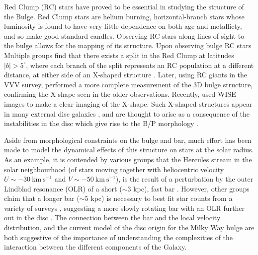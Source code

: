 Red Clump (RC) stars have proved to be essential in studying the structure of the Bulge. Red Clump stars are helium burning, horizontal-branch stars whose luminosity is found to have very little dependence on both age and metallicty, and so make good standard candles. Observing RC stars along lines of sight to the bulge allows for the mapping of its structure. Upon observing bulge RC stars Multiple groups find that there exists a split in the Red Clump at latitudes $|b| > 5^{\circ}$, where each branch of the split represents an RC population at a different distance, at either side of an X-shaped structure \citep{2010ApJ...721L..28N,2010ApJ...724.1491M,2011AJ....142...76S}. Later, using RC giants in the VVV survey, \citet{2013MNRAS.435.1874W} performed a more complete measurement of the 3D bulge structure, confirming the X-shape seen in the older observations. Recently, \citet{2016AJ....152...14N} used WISE images to make a clear imaging of the X-shape. Such X-shaped structures appear in many external disc galaxies \citep[e.g.][]{2006MNRAS.370..753B}, and are thought to arise as a consequence of the instabilities in the disc which give rise to the B/P morphology \citep[based on studies of N-body simulations, e.g.][]{2005MNRAS.358.1477A,2006ApJ...645..209D}.

Aside from morphological constraints on the bulge and bar, much effort has been made to model the dynamical effects of this structure on stars at the solar radius. As an example, it is contended by various groups that the Hercules stream in the solar neighbourhood (of stars moving together with heliocentric velocity $U \sim -30\ \mathrm{km\ s^{-1}}$ and $V \sim -50\ \mathrm{km\ s^{-1}}$), is the result of a perturbation by the outer Lindblad resonance (OLR) of a short ($\sim 3$ kpc), fast bar \citep{2000AJ....119..800D,2014A&A...563A..60A,2017MNRAS.466L.113M}. However, other groups claim that a longer bar ($\sim 5$ kpc) is necessary to best fit star counts from a variety of surveys \citep{2015MNRAS.450.4050W}, suggesting a more slowly rotating bar with an OLR further out in the disc \citep[although see][for a reconciliation of Hercules with a long, slow bar]{2018MNRAS.477.3945H}. The connection between the bar and the local velocity distribution, and the current model of the disc origin for the Milky Way bulge are both suggestive of the importance of understanding the complexities of the interaction between the different components of the Galaxy.

